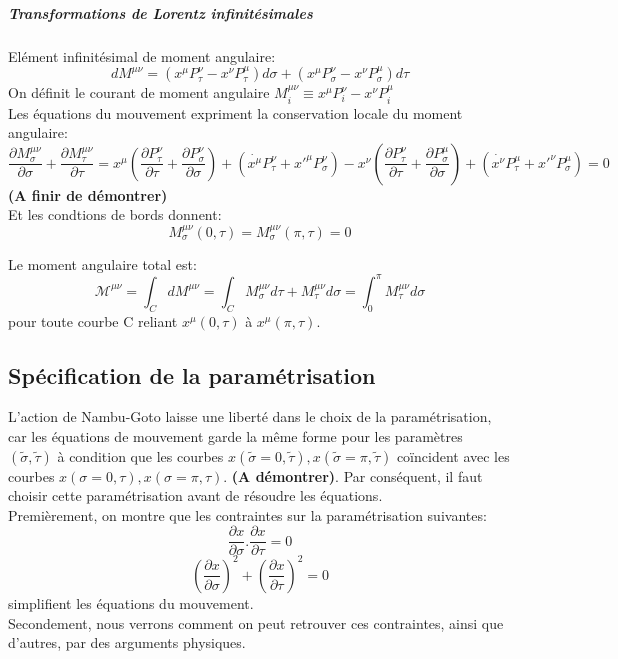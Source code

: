 \documentclass[a4paper,12pt]{article}
\begin{document}
\subparagraph{Transformations de Lorentz infinitésimales}
Elément infinitésimal de moment angulaire:
$$dM^{\mu\nu}=(x^{\mu}P^{\nu}_{\tau}-x^{\nu}P^{\mu}_{\tau})d\sigma+(x^{\mu}P^{\nu}_{\sigma}-x^{\nu}P^{\mu}_{\sigma})d\tau$$
On définit le courant de moment angulaire $M_{i}^{\mu\nu}\equiv x^{\mu}P^{\nu}_{i}-x^{\nu}P^{\mu}_{i}$\\
Les équations du mouvement expriment la conservation locale du moment angulaire:
$$\frac{\partial M_{\sigma}^{\mu\nu}}{\partial \sigma}+\frac{\partial M_{\tau}^{\mu\nu}}{\partial \tau}=x^{\mu}\left( \frac{\partial P^{\nu}_{\tau}}{\partial \tau}+\frac{\partial P^{\nu}_{\sigma}}{\partial \sigma}\right) +\left( \dot{x^{\mu}}P^{\nu}_{\tau}+x'^{\mu}P^{\nu}_{\sigma}\right) -x^{\nu}\left( \frac{\partial P^{\nu}_{\tau}}{\partial \tau}+\frac{\partial P^{\mu}_{\sigma}}{\partial \sigma}\right) +\left( \dot{x^{\nu}}P^{\mu}_{\tau}+x'^{\nu}P^{\mu}_{\sigma}\right)=0$$
\textbf{(A finir de démontrer)}\\
Et les condtions de bords donnent:
$$M_{\sigma}^{\mu\nu}(0,\tau)=M_{\sigma}^{\mu\nu}(\pi,\tau)=0$$

Le moment angulaire total est: 
$$\mathcal{M^{\mu\nu}}=\int_{C}dM^{\mu\nu}=\int_{C}M^{\mu\nu}_{\sigma}d\tau+M^{\mu\nu}_{\tau}d\sigma=\int_{0}^{\pi}M^{\mu\nu}_{\tau}d\sigma$$
pour toute courbe C reliant $x^{\mu}(0,\tau)$ à $x^{\mu}(\pi,\tau)$.
\subsection{Spécification de la paramétrisation}
L'action de Nambu-Goto laisse une liberté dans le choix de la paramétrisation, car les équations de mouvement garde la même forme pour les paramètres $(\tilde{\sigma},\tilde{\tau})$ à condition que les courbes $x(\tilde{\sigma}=0,\tilde{\tau}), x(\tilde{\sigma}=\pi,\tilde{\tau})$ coïncident avec les courbes $x(\sigma=0,\tau), x(\sigma=\pi,\tau)$. \textbf{(A démontrer)}.
Par conséquent, il faut choisir cette paramétrisation avant de résoudre les équations.\\
Premièrement, on montre que les contraintes sur la paramétrisation suivantes:
\begin{equation}
\frac{\partial x}{\partial \sigma}.\frac{\partial x}{\partial \tau}=0
\end{equation}
\begin{equation}
\left( \frac{\partial x}{\partial \sigma}\right) ^{2}+\left(\frac{\partial x}{\partial \tau}\right) ^{2}=0 
\end{equation}
simplifient les équations du mouvement.\\ Secondement, nous verrons comment on peut retrouver ces contraintes, ainsi que d'autres, par des arguments physiques. 
\end{document}
